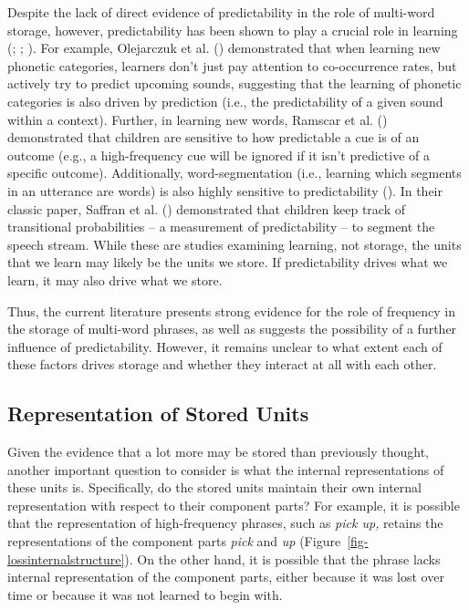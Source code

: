 \documentclass[
  12pt,
  letterpaper,
]{scrreprt}
\begin{document}
Despite the lack of direct evidence of predictability in the role of
multi-word storage, however, predictability has been shown to play a
crucial role in learning
(;
; ). For example, Olejarczuk et al.
()
demonstrated that when learning new phonetic categories, learners don't
just pay attention to co-occurrence rates, but actively try to predict
upcoming sounds, suggesting that the learning of phonetic categories is
also driven by prediction (i.e., the predictability of a given sound
within a context). Further, in learning new words, Ramscar et al.
()
demonstrated that children are sensitive to how predictable a cue is of
an outcome (e.g., a high-frequency cue will be ignored if it isn't
predictive of a specific outcome). Additionally, word-segmentation
(i.e., learning which segments in an utterance are words) is also highly
sensitive to predictability
(). In their classic paper, Saffran et al.
()
demonstrated that children keep track of transitional probabilities -- a
measurement of predictability -- to segment the speech stream. While
these are studies examining learning, not storage, the units that we
learn may likely be the units we store. If predictability drives what we
learn, it may also drive what we store.

Thus, the current literature presents strong evidence for the role of
frequency in the storage of multi-word phrases, as well as suggests the
possibility of a further influence of predictability. However, it
remains unclear to what extent each of these factors drives storage and
whether they interact at all with each other.

\subsection{Representation of Stored
Units}\label{representation-of-stored-units}

Given the evidence that a lot more may be stored than previously
thought, another important question to consider is what the internal
representations of these units is. Specifically, do the stored units
maintain their own internal representation with respect to their
component parts? For example, it is possible that the representation of
high-frequency phrases, such as \emph{pick up,} retains the
representations of the component parts \emph{pick} and \emph{up}
(Figure~\ref{fig-lossinternalstructure}). On the other hand, it is
possible that the phrase lacks internal representation of the component
parts, either because it was lost over time or because it was not
learned to begin with.
\end{document}
